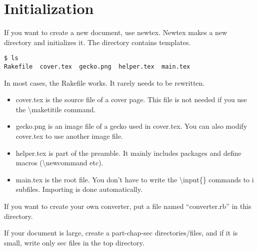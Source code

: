 \section{Initialization}

If you want to create a new document, use newtex. Newtex makes a new
directory and initializes it. The directory contains templates.

\begin{verbatim}
$ ls
Rakefile  cover.tex  gecko.png  helper.tex  main.tex
\end{verbatim}

In most cases, the Rakefile works. It rarely needs to be rewritten.

\begin{itemize}
\item
  cover.tex is the source file of a cover page. This file is not needed
  if you use the {\textbackslash}maketitile command.
\item
  gecko.png is an image file of a gecko used in cover.tex. You can also
  modify cover.tex to use another image file.
\item
  helper.tex is part of the preamble. It mainly includes packages and
  define macros ({\textbackslash}newcommand etc).
\item
  main.tex is the root file. You don't have to write the
  {\textbackslash}input\{\} commands to i subfiles. Importing is done
  automatically.
\end{itemize}

If you want to create your own converter, put a file named
``converter.rb'' in this directory.

If your document is large, create a part-chap-sec directories/files, and
if it is small, write only sec files in the top directory.
